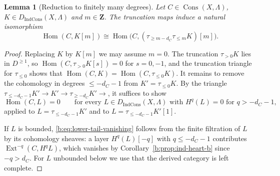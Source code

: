 \documentclass[11pt,a4paper]{article}
\numberwithin{equation}{section}
\newtheorem{lemma}[theorem]{Lemma}
\theoremstyle{definition}
\theoremstyle{remark}
\newcommand{\D}{D}
\newcommand{\Hom}{\operatorname{Hom}}
\newcommand{\Ext}{\operatorname{Ext}}
\newcommand{\Cons}{\operatorname{Cons}}
\newcommand{\IndCons}{\operatorname{IndCons}}
\newcommand{\Dic}{D_{\IndCons}}
\begin{document}
\begin{lemma}[Reduction to finitely many degrees]\label{b:lem:finite-window}
Let $C\in\Cons(X,\Lambda)$, $K\in\Dic(X,\Lambda)$ and $m\in\mathbf Z$. The
truncation maps induce a natural isomorphism
\begin{equation}\label{b:eq:finite-window}
 \Hom(C,K[m])
 \cong\Hom\bigl(C,(\tau_{\geq m-d_C}\tau_{\leq m}K)[m]\bigr).
\end{equation}
\end{lemma}
\begin{proof}
Replacing $K$ by $K[m]$ we may assume $m=0$. The truncation
$\tau_{>0}K$ lies in $\D^{\geq1}$, so $\Hom(C,\tau_{>0}K[s])=0$ for
$s=0,-1$, and the truncation triangle for $\tau_{\leq0}$ shows that
$\Hom(C,K)=\Hom(C,\tau_{\leq0}K)$. It remains to remove the cohomology
in degrees $\leq-d_C-1$ from $K'=\tau_{\leq0}K$. By the triangle
$\tau_{\leq-d_C-1}K'\to K'\to\tau_{\geq-d_C}K'\to$, it suffices to show
\begin{equation}\label{b:eq:lower-tail-vanishing}
 \Hom(C,L)=0\qquad
 \text{for every }L\in\Dic(X,\Lambda)\text{ with }H^q(L)=0\text{ for }q>-d_C-1,
\end{equation}
applied to $L=\tau_{\leq-d_C-1}K'$ and to $L=\tau_{\leq-d_C-1}K'[1]$.

If $L$ is bounded, \eqref{b:eq:lower-tail-vanishing} follows from the
finite filtration of $L$ by its cohomology sheaves: a layer $H^q(L)[-q]$
with $q\leq-d_C-1$ contributes $\Ext^{-q}(C,H^qL)$, which vanishes by
Corollary~\ref{b:prop:ind-heart-b} since $-q>d_C$. For $L$ unbounded
below we use that the derived category is left complete.


\end{proof}
\end{document}
